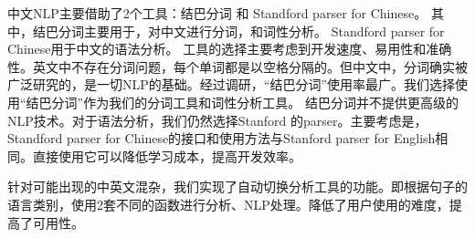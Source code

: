     中文NLP主要借助了2个工具：结巴分词 和 Standford parser for Chinese。
    其中，结巴分词主要用于，对中文进行分词，和词性分析。
    Standford parser for Chinese用于中文的语法分析。
    工具的选择主要考虑到开发速度、易用性和准确性。英文中不存在分词问题，每个单词都是以空格分隔的。但中文中，分词确实被广泛研究的，是一切NLP的基础。经过调研，“结巴分词”使用率最广。我们选择使用“结巴分词”作为我们的分词工具和词性分析工具。
    结巴分词并不提供更高级的NLP技术。对于语法分析，我们仍然选择Stanford 的parser。主要考虑是，Standford parser for Chinese的接口和使用方法与Stanford parser for English相同。直接使用它可以降低学习成本，提高开发效率。

    针对可能出现的中英文混杂，我们实现了自动切换分析工具的功能。即根据句子的语言类别，使用2套不同的函数进行分析、NLP处理。降低了用户使用的难度，提高了可用性。
    